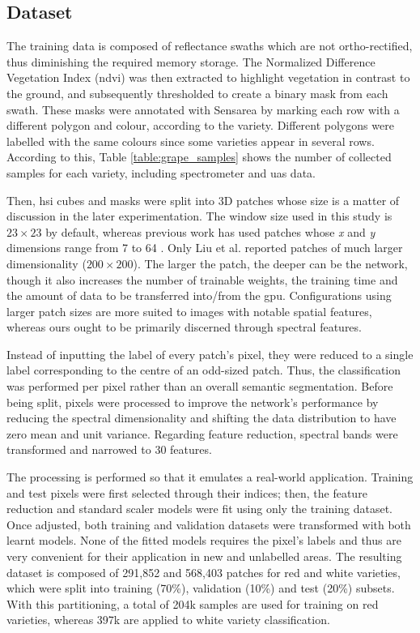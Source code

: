 \subsection{Dataset}

The training data is composed of reflectance swaths which are not ortho-rectified, thus diminishing the required memory storage. The Normalized Difference Vegetation Index (\acrshort{ndvi}) was then extracted to highlight vegetation in contrast to the ground, and subsequently thresholded to create a binary mask from each swath. These masks were annotated with Sensarea \cite{bertolino_sensarea_2012} by marking each row with a different polygon and colour, according to the variety. Different polygons were labelled with the same colours since some varieties appear in several rows. According to this, Table \ref{table:grape_samples} shows the number of collected samples for each variety, including spectrometer and \acrshort{uas} data. 

Then, \acrshort{hsi} cubes and masks were split into 3D patches whose size is a matter of discussion in the later experimentation. The window size used in this study is $23 \times 23$ by default, whereas previous work has used patches whose \textit{x} and \textit{y} dimensions range from 7 \cite{roy_attention-based_2021} to 64 \cite{chakraborty_spectralnet_2021}. Only Liu et al. \cite{liu_plant_2022} reported patches of much larger dimensionality ($200 \times 200$). The larger the patch, the deeper can be the network, though it also increases the number of trainable weights, the training time and the amount of data to be transferred into/from the \acrshort{gpu}. Configurations using larger patch sizes are more suited to images with notable spatial features, whereas ours ought to be primarily discerned through spectral features. 

Instead of inputting the label of every patch's pixel, they were reduced to a single label corresponding to the centre of an odd-sized patch. Thus, the classification was performed per pixel rather than an overall semantic segmentation. Before being split, pixels were processed to improve the network's performance by reducing the spectral dimensionality and shifting the data distribution to have zero mean and unit variance. Regarding feature reduction, spectral bands were transformed and narrowed to 30 features.

The processing is performed so that it emulates a real-world application. Training and test pixels were first selected through their indices; then, the feature reduction and standard scaler models were fit using only the training dataset. Once adjusted, both training and validation datasets were transformed with both learnt models. None of the fitted models requires the pixel's labels and thus are very convenient for their application in new and unlabelled areas. The resulting dataset is composed of 291,852 and 568,403 patches for red and white varieties, which were split into training (70\%), validation (10\%) and test (20\%) subsets. With this partitioning, a total of 204k samples are used for training on red varieties, whereas 397k are applied to white variety classification.

